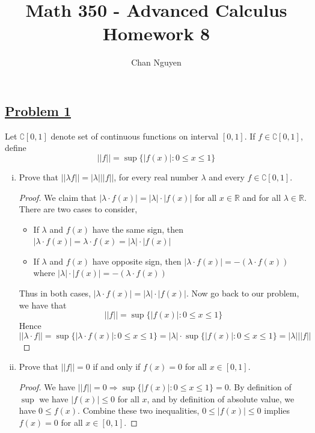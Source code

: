 \documentclass[10pt,letterpaper]{article}
\title{\textbf{Math 350 - Advanced Calculus \\ Homework 8}}
\author{Chan Nguyen}
\begin{document}
\tableofcontents 
\maketitle

\setlength{\parindent}{0pt}
\setlength{\parskip}{1ex}
	\subsection*{{\color{purple}\underline{Problem 1}}}
	Let $\complement[0, 1]$ denote set of continuous functions on interval $[0, 1]$. If
	$f \in \complement[0, 1]$, define
	$$||f|| = \sup\{|f(x)| : 0 \leq x \leq 1\}$$
	\begin{enumerate}[(i)]
		\item Prove that $||\lambda f|| = |\lambda|||f||$, for every real number $\lambda$ and every 
		$f \in \complement[0, 1]$.
		\begin{proof}
		We claim that $|\lambda \cdot f(x)| = |\lambda| \cdot |f(x)|$ for all $x \in \mathbb{R}$ and 
		for all $\lambda \in \mathbb{R}$. There are two cases to consider,
		\begin{itemize}
			\item If $\lambda$ and $f(x)$ have the same sign, then 
			$|\lambda \cdot f(x)| = \lambda \cdot f(x) = |\lambda| \cdot |f(x)|$
			\item If $\lambda$ and $f(x)$ have opposite sign, then
			$|\lambda \cdot f(x)| = -(\lambda \cdot f(x))$ where
			$|\lambda| \cdot |f(x)| = -(\lambda \cdot f(x))$ 
		\end{itemize}
		Thus in both cases, $|\lambda \cdot f(x)| = |\lambda| \cdot |f(x)|$.
		Now go back to our problem, we have that 
		$$||f|| = \sup\{|f(x)| : 0 \leq x \leq 1\}$$
		Hence $$||\lambda \cdot f|| = \sup\{|\lambda \cdot f(x)| : 0 \leq x \leq 1 \} = |\lambda| \cdot 
		\sup\{|f(x)| : 0 \leq x \leq 1\} = |\lambda| ||f||$$
		\end{proof}
		
		\item Prove that $||f|| = 0$ if and only if $f(x) = 0$ for all $x \in [0, 1]$.
		\begin{proof}
		We have $||f|| = 0 \Rightarrow \sup\{|f(x)| : 0 \leq x \leq 1\} = 0$. By definition 
		of $\sup$ we have $|f(x)| \leq 0$ for all $x$, and by definition of absolute value, we have
		$0 \leq f(x)$. Combine these two inequalities, $0 \leq |f(x)| \leq 0$ implies $f(x) = 0$
		for all $x \in [0, 1]$.		
		\end{proof}
				

\end{enumerate}
\end{document}
